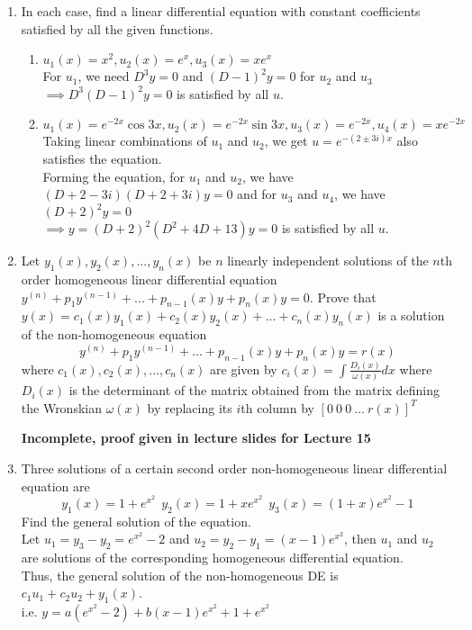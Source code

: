 \documentclass[a4paper]{article}
\begin{document}
\begin{enumerate}
	
	\item In each case, find a linear differential equation with constant coefficients satisfied by all the given functions.
	\begin{enumerate}
		\item $u_1(x) =x^2, u_2(x)=e^x, u_3(x)=xe^x$\\
		For $u_1$, we need $D^3y=0$ and $(D-1)^2y=0$ for $u_2$ and $u_3$\\
		$\implies D^3(D-1)^2y=0$ is satisfied by all $u$.
		
		\item $u_1(x)=e^{-2x}\cos 3x, u_2(x)=e^{-2x}\sin 3x, u_3(x)=e^{-2x}, u_4(x)=xe^{-2x}$\\
		Taking linear combinations of $u_1$ and $u_2$, we get $u=e^{-(2\pm 3i)x}$ also satisfies the equation.\\
		Forming the equation, for $u_1$ and $u_2$, we have $(D+2-3i)(D+2+3i)y=0$ and for $u_3$ and $u_4$, we have $(D+2)^2y=0$\\
		$\implies y=(D+2)^2(D^2+4D+13)y=0$ is satisfied by all $u$.
		
	\end{enumerate}

	\item Let $y_1(x),y_2(x),...,y_n(x)$ be $n$ linearly independent solutions of the $n$th order homogeneous linear differential equation $y^{(n)}+p_1y^{(n-1)}+...+p_{n-1}(x)y+p_n(x)y=0$. Prove that $y(x)=c_1(x)y_1(x)+c_2(x)y_2(x)+...+c_n(x)y_n(x)$ is a solution of the non-homogeneous equation \[ y^{(n)}+p_1y^{(n-1)}+...+p_{n-1}(x)y+p_n(x)y=r(x) \]
	where $c_1(x),c_2(x),...,c_n(x)$ are given by $c_i(x)=\int \frac{D_i(x)}{\omega(x)}dx$ where $D_i(x)$ is the determinant of the matrix obtained from the matrix defining the Wronskian $\omega (x)$ by replacing its $i$th column by 
	$[0 \ 0 \ 0 \ ... \ r(x)]^T$
	
	\textbf{Incomplete, proof given in lecture slides for Lecture 15}
	
	\item Three solutions of a certain second order non-homogeneous linear differential equation are
	\[y_1(x)=1+e^{x^2} \ \ y_2	(x)=1+xe^{x^2} \ \ y_3(x)=(1+x)e^{x^2}-1\]
	Find the general solution of the equation.\\
	Let $u_1=y_3-y_2=e^{x^2}-2$ and $u_2=y_2-y_1=(x-1)e^{x^2}$, then $u_1$ and $u_2$ are solutions of the corresponding homogeneous differential equation.\\
	Thus, the general solution of the non-homogeneous DE is $c_1u_1+c_2u_2+y_1(x)$.\\
	i.e. $y=a(e^{x^2}-2)+b(x-1)e^{x^2}+1+e^{x^2}$
	

\end{enumerate}
\end{document}
